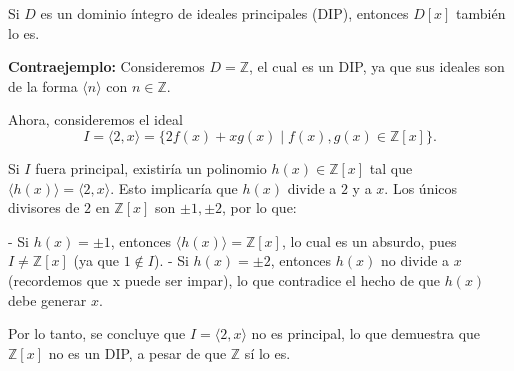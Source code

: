  Si \( D \) es un dominio íntegro de ideales principales (DIP), entonces \( D[x] \) también lo es.

\textbf{Contraejemplo:} Consideremos \( D = \mathbb{Z} \), el cual es un DIP, ya que sus ideales son de la forma \( \langle n \rangle \) con \( n \in \mathbb{Z} \).

Ahora, consideremos el ideal
\[
I = \langle 2, x \rangle = \{ 2f(x) + xg(x) \mid f(x), g(x) \in \mathbb{Z}[x] \}.
\]

Si \( I \) fuera principal, existiría un polinomio \( h(x) \in \mathbb{Z}[x] \) tal que \( \langle h(x) \rangle = \langle 2, x \rangle \). Esto implicaría que \( h(x) \) divide a \( 2 \) y a \( x \). Los únicos divisores de \( 2 \) en \( \mathbb{Z}[x] \) son \( \pm 1, \pm 2 \), por lo que:

- Si \( h(x) = \pm 1 \), entonces \( \langle h(x) \rangle = \mathbb{Z}[x] \), lo cual es un absurdo, pues \( I \neq \mathbb{Z}[x] \) (ya que \( 1 \notin I \)).
- Si \( h(x) = \pm 2 \), entonces \( h(x) \) no divide a \( x \) (recordemos que x puede ser impar), lo que contradice el hecho de que \( h(x) \) debe generar \( x \).

Por lo tanto, se concluye que \( I = \langle 2, x \rangle \) no es principal, lo que demuestra que \( \mathbb{Z}[x] \) no es un DIP, a pesar de que \( \mathbb{Z} \) sí lo es.
